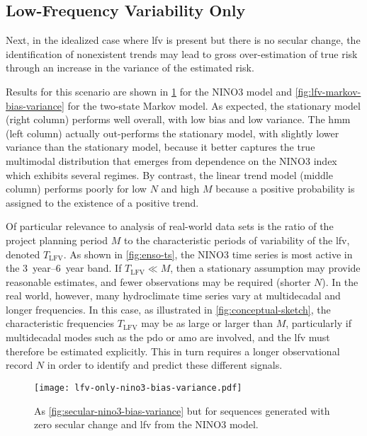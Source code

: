 \documentclass[
]{agujournal2018}
\begin{document}
\subsection{Low-Frequency Variability Only}

Next, in the idealized case where  \gls{lfv} is present but there is no secular change, the identification of nonexistent trends may lead to gross over-estimation of true risk through an increase in the variance of the estimated risk.

Results for this scenario are shown in \cref{fig:lfv-nino3-bias-variance} for the NINO3 model and \cref{fig:lfv-markov-bias-variance} for the two-state Markov model.
As expected, the stationary model (right column) performs well overall, with low bias and low variance.
The \gls{hmm} (left column) actually out-performs the stationary model, with slightly lower variance than the stationary model, because it better captures the true multimodal distribution that emerges from dependence on the NINO3 index which exhibits several regimes.
By contrast, the linear trend model (middle column) performs poorly for low $N$ and high $M$ because a positive probability is assigned to the existence of a positive trend.

Of particular relevance to analysis of real-world data sets is the ratio of the project planning period $M$ to the characteristic periods of variability of the \gls{lfv}, denoted $T_{\text{LFV}}$.
As shown in \cref{fig:enso-ts}, the NINO3 time series is most active in the \SIrange{3}{6}{year} band.
If $T_{\text{LFV}} \ll M$, then a stationary assumption may provide reasonable estimates, and fewer observations may be required (shorter $N$).
In the real world, however, many hydroclimate time series vary at multidecadal and longer frequencies.
In this case, as illustrated in \cref{fig:conceptual-sketch}, the characteristic frequencies $T_{\text{LFV}}$ may be as large or larger than $M$, particularly if multidecadal modes such as the \gls{pdo} or \gls{amo} are involved, and the \gls{lfv} must therefore be estimated explicitly.
This in turn requires a longer observational record $N$ in order to identify and predict these different signals.

\begin{figure}
  \centering
  \texttt{[image: lfv-only-nino3-bias-variance.pdf]}
  \caption{
    As \cref{fig:secular-nino3-bias-variance} but for sequences generated with zero secular change and \gls{lfv} from the NINO3 model.
  }\label{fig:lfv-nino3-bias-variance}
\end{figure}
\end{document}
